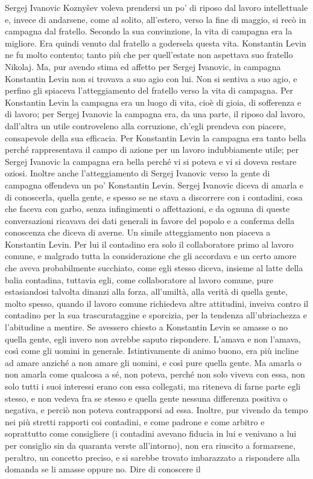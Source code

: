 \label{parte-terza} 
\pagestyle{pagina}

Sergej Ivanovic Koznyšev voleva prendersi un po' di riposo dal lavoro intellettuale e, invece di andarsene, come al solito, all'estero, verso la fine di maggio, si recò in campagna dal fratello. Secondo la sua convinzione, la vita di campagna era la migliore. Era quindi venuto dal fratello a godersela questa vita. Konstantin Levin ne fu molto contento; tanto più che per quell'estate non aspettava suo fratello Nikolaj. Ma, pur avendo stima ed affetto per Sergej Ivanovic, in campagna Konstantin Levin non si trovava a suo agio con lui. Non si sentiva a suo agio, e perfino gli spiaceva l'atteggiamento del fratello verso la vita di campagna. Per Konstantin Levin la campagna era un luogo di vita, cioè di gioia, di sofferenza e di lavoro; per Sergej Ivanovic la campagna era, da una parte, il riposo dal lavoro, dall'altra un utile controveleno alla corruzione, ch'egli prendeva con piacere, consapevole della sua efficacia. Per Konstantin Levin la campagna era tanto bella perché rappresentava il campo di azione per un lavoro indubbiamente utile; per Sergej Ivanovic la campagna era bella perché vi si poteva e vi si doveva restare oziosi. Inoltre anche l'atteggiamento di Sergej Ivanovic verso la gente di campagna offendeva un po' Konstantin Levin. Sergej Ivanovic diceva di amarla e di conoscerla, quella gente, e spesso se ne stava a discorrere con i contadini, cosa che faceva con garbo, senza infingimenti o affettazioni, e da ognuna di queste conversazioni ricavava dei dati generali in favore del popolo e a conferma della conoscenza che diceva di averne. Un simile atteggiamento non piaceva a Konstantin Levin. Per lui il contadino era solo il collaboratore primo al lavoro comune, e malgrado tutta la considerazione che gli accordava e un certo amore che aveva probabilmente succhiato, come egli stesso diceva, insieme al latte della balia contadina, tuttavia egli, come collaboratore al lavoro comune, pure estasiandosi talvolta dinanzi alla forza, all'umiltà, alla verità di quella gente, molto spesso, quando il lavoro comune richiedeva altre attitudini, inveiva contro il contadino per la sua trascurataggine e sporcizia, per la tendenza all'ubriachezza e l'abitudine a mentire. Se avessero chiesto a Konstantin Levin se amasse o no quella gente, egli invero non avrebbe saputo rispondere. L'amava e non l'amava, così come gli uomini in generale. Istintivamente di animo buono, era più incline ad amare anziché a non amare gli uomini, e così pure quella gente. Ma amarla o non amarla come qualcosa a sé, non poteva, perché non solo viveva con essa, non solo tutti i suoi interessi erano con essa collegati, ma riteneva di farne parte egli stesso, e non vedeva fra se stesso e quella gente nessuna differenza positiva o negativa, e perciò non poteva contrapporsi ad essa. Inoltre, pur vivendo da tempo nei più stretti rapporti coi contadini, e come padrone e come arbitro e soprattutto come consigliere (i contadini avevano fiducia in lui e venivano a lui per consiglio sin da quaranta verste all'intorno), non era riuscito a formarsene, peraltro, un concetto preciso, e si sarebbe trovato imbarazzato a rispondere alla domanda se li amasse oppure no. Dire di conoscere il 